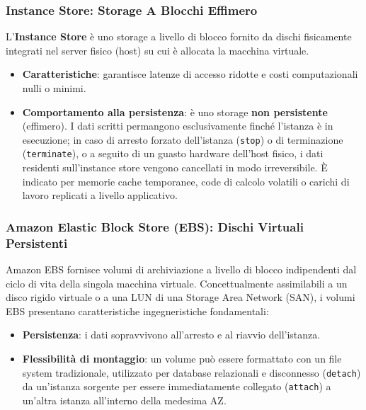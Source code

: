\documentclass[11pt, a4paper]{article}
\begin{document}
\subsubsection{Instance Store: Storage A Blocchi Effimero}
L'\textbf{Instance Store} è uno storage a livello di blocco fornito da dischi fisicamente integrati nel server fisico (host) su cui è allocata la macchina virtuale.
\begin{itemize}
    \item \textbf{Caratteristiche}: garantisce latenze di accesso ridotte e costi computazionali nulli o minimi.
    \item \textbf{Comportamento alla persistenza}: è uno storage \textbf{non persistente} (effimero). I dati scritti permangono esclusivamente finché l'istanza è in esecuzione; in caso di arresto forzato dell'istanza (\texttt{stop}) o di terminazione (\texttt{terminate}), o a seguito di un guasto hardware dell'host fisico, i dati residenti sull'instance store vengono cancellati in modo irreversibile. È indicato per memorie cache temporanee, code di calcolo volatili o carichi di lavoro replicati a livello applicativo.
\end{itemize}

\subsubsection{Amazon Elastic Block Store (EBS): Dischi Virtuali Persistenti}
Amazon EBS fornisce volumi di archiviazione a livello di blocco indipendenti dal ciclo di vita della singola macchina virtuale. Concettualmente assimilabili a un disco rigido virtuale o a una LUN di una Storage Area Network (SAN), i volumi EBS presentano caratteristiche ingegneristiche fondamentali:
\begin{itemize}
    \item \textbf{Persistenza}: i dati sopravvivono all'arresto e al riavvio dell'istanza.
    \item \textbf{Flessibilità di montaggio}: un volume può essere formattato con un file system tradizionale, utilizzato per database relazionali e disconnesso (\texttt{detach}) da un'istanza sorgente per essere immediatamente collegato (\texttt{attach}) a un'altra istanza all'interno della medesima AZ.
\end{itemize}

\end{document}
